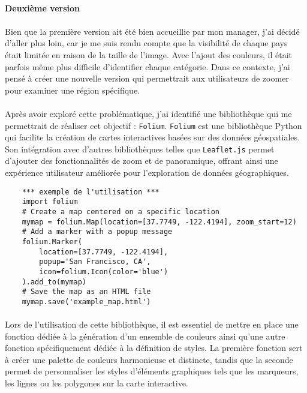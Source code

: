 \paragraph{}
\vspace{-2em}
{\large\textbf{Deuxième version}}
\paragraph{}
\vspace{-2em}
Bien que la première version ait été bien accueillie par mon manager, j'ai décidé d'aller plus loin, car je me suis rendu compte que la visibilité de chaque pays était limitée en raison de la taille de l'image. Avec l'ajout des couleurs, il était parfois même plus difficile d'identifier chaque catégorie. Dans ce contexte, j'ai pensé à créer une nouvelle version qui permettrait aux utilisateurs de zoomer pour examiner une région spécifique.
\paragraph{}
\vspace{-2em}

Après avoir exploré cette problématique, j'ai identifié une bibliothèque qui me permettrait de réaliser cet objectif : \texttt{Folium}. \texttt{Folium} est une bibliothèque Python qui facilite la création de cartes interactives basées sur des données géospatiales. Son intégration avec d'autres bibliothèques telles que \texttt{Leaflet.js} permet d'ajouter des fonctionnalités de zoom et de panoramique, offrant ainsi une expérience utilisateur améliorée pour l'exploration de données géographiques.

\begin{verbatim}
    *** exemple de l'utilisation ***
    import folium
    # Create a map centered on a specific location
    mymap = folium.Map(location=[37.7749, -122.4194], zoom_start=12)
    # Add a marker with a popup message
    folium.Marker(
        location=[37.7749, -122.4194],
        popup='San Francisco, CA',
        icon=folium.Icon(color='blue')
    ).add_to(mymap)
    # Save the map as an HTML file
    mymap.save('example_map.html')
\end{verbatim}

\paragraph{}    
\vspace{-2em}
Lors de l'utilisation de cette bibliothèque, il est essentiel de mettre en place une fonction dédiée à la génération d'un ensemble de couleurs ainsi qu'une autre fonction spécifiquement dédiée à la définition de styles. La première fonction sert à créer une palette de couleurs harmonieuse et distincte, tandis que la seconde permet de personnaliser les styles d'éléments graphiques tels que les marqueurs, les lignes ou les polygones sur la carte interactive. 

